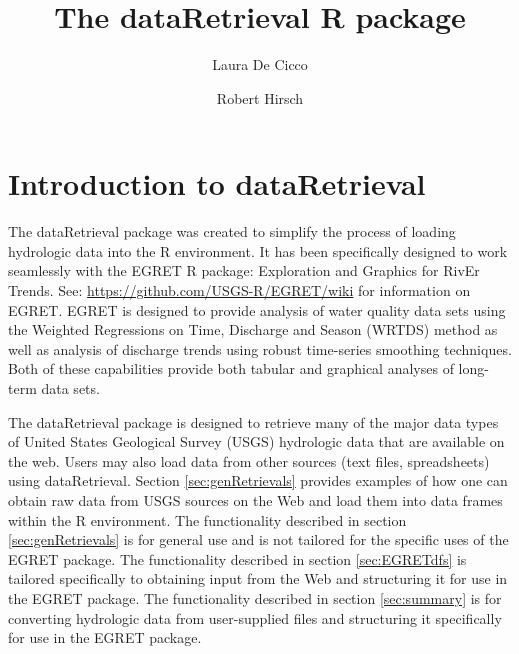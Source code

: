 \documentclass[a4paper,11pt]{article}\usepackage[]{graphicx}\usepackage[]{color}
\begin{document}
\renewenvironment{knitrout}{\begin{singlespace}}{\end{singlespace}}
\renewcommand*\listfigurename{Figures}

\renewcommand*\listtablename{Tables}


\title{The dataRetrieval R package}
\author[1]{Laura De Cicco}
\author[1]{Robert Hirsch}






\maketitle

\newpage 

\tableofcontents
\listoffigures
\listoftables

\newpage

\section{Introduction to dataRetrieval}
The dataRetrieval package was created to simplify the process of loading hydrologic data into the R environment. It has been specifically designed to work seamlessly with the EGRET R package: Exploration and Graphics for RivEr Trends. See: \url{https://github.com/USGS-R/EGRET/wiki} for information on EGRET. EGRET is designed to provide analysis of water quality data sets using the Weighted Regressions on Time, Discharge and Season (WRTDS) method as well as analysis of discharge trends using robust time-series smoothing techniques.  Both of these capabilities provide both tabular and graphical analyses of long-term data sets.


The dataRetrieval package is designed to retrieve many of the major data types of United States Geological Survey (USGS) hydrologic data that are available on the web. Users may also load data from other sources (text files, spreadsheets) using dataRetrieval.  Section \ref{sec:genRetrievals} provides examples of how one can obtain raw data from USGS sources on the Web and load them into data frames within the R environment.  The functionality described in section \ref{sec:genRetrievals} is for general use and is not tailored for the specific uses of the EGRET package.  The functionality described in section \ref{sec:EGRETdfs} is tailored specifically to obtaining input from the Web and structuring it for use in the EGRET package.  The functionality described in section \ref{sec:summary} is for converting hydrologic data from user-supplied files and structuring it specifically for use in the EGRET package.
\end{document}
